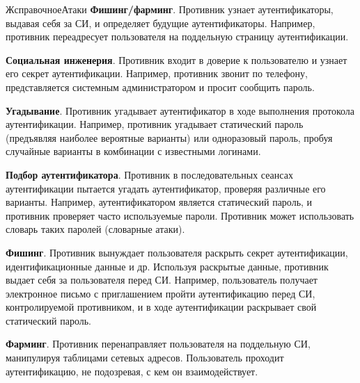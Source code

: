 \begin{appendix}{Ж}{справочное}{Атаки}
{\bf Фишинг/фарминг}. 
Противник узнает аутентификаторы, выдавая себя за СИ, и определяет будущие 
аутентификаторы.
%
Например, противник переадресует пользователя на поддельную страницу 
аутентификации.


{\bf Социальная инженерия}. 
Противник входит в доверие к пользователю и узнает его секрет аутентификации.
%
Например, противник звонит по телефону, представляется системным администратором 
и просит сообщить пароль.


{\bf Угадывание}. 
Противник угадывает аутентификатор в ходе выполнения протокола аутентификации.
%
Например, противник угадывает статический пароль (предъявляя наиболее
вероятные варианты) или одноразовый пароль, пробуя случайные варианты в 
комбинации с известными логинами.


\label{ATK.AP}

{\bf Подбор аутентификатора}. 
Противник в последовательных сеансах аутентификации пытается 
угадать аутентификатор, проверяя различные его варианты. 
Например, аутентификатором является статический пароль, 
и противник проверяет часто используемые пароли. 
Противник может использовать словарь таких паролей (словарные атаки).


{\bf Фишинг}. 
Противник вынуждает пользователя раскрыть секрет аутентификации, 
идентификационные данные и др. Используя раскрытые данные, противник 
выдает себя за пользователя перед СИ. Например, пользователь  
получает электронное письмо с приглашением пройти аутентификацию перед 
СИ, контролируемой противником, и в ходе аутентификации раскрывает 
свой статический пароль. 

{\bf Фарминг}. 
Противник перенаправляет пользователя на поддельную СИ,
манипулируя таблицами сетевых адресов.
Пользователь проходит аутентификацию, не подозревая,
с кем он взаимодействует.


\end{appendix}
